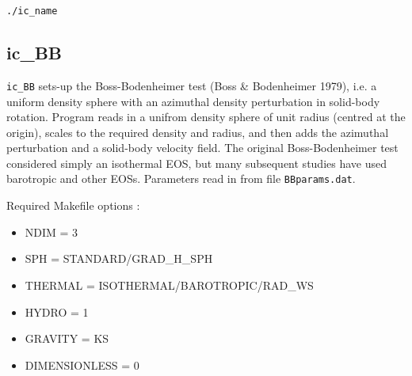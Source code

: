 \documentclass[a4paper]{article}
\newcommand{\var}[1]{\texttt{#1}}
\begin{document}
\var{./ic\_name}


\subsection{ic\_BB}
\var{ic\_BB} sets-up the Boss-Bodenheimer test (Boss \& Bodenheimer 1979), i.e. a uniform density sphere with an azimuthal density perturbation in solid-body rotation.  Program reads in a unifrom density sphere of unit radius (centred at the origin), scales to the required density and radius, and then adds the azimuthal perturbation and a solid-body velocity field.  The original Boss-Bodenheimer test considered simply an isothermal EOS, but many subsequent studies have used barotropic and other EOSs.  Parameters read in from file \var{BBparams.dat}. \newline

\noindent Required Makefile options :
\begin{itemize}
\item NDIM = 3
\item SPH = STANDARD/GRAD\_H\_SPH
\item THERMAL = ISOTHERMAL/BAROTROPIC/RAD\_WS
\item HYDRO = 1
\item GRAVITY = KS
\item DIMENSIONLESS = 0
\end{itemize}
\vspace{0.1cm}
\end{document}
